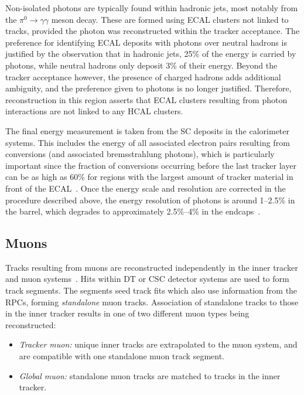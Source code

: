 Non-isolated photons are typically found within hadronic jets, most notably from the $\pi^{0}\rightarrow\gamma\gamma$ meson decay. These are formed using ECAL clusters not linked to tracks, provided the photon was reconstructed within the tracker acceptance. The preference for identifying ECAL deposits with photons over neutral hadrons is justified by the observation that in hadronic jets, 25\% of the energy is carried by photons, while neutral hadrons only deposit 3\% of their energy. Beyond the tracker acceptance however, the presence of charged hadrons adds additional ambiguity, and the preference given to photons is no longer justified. Therefore, reconstruction in this region asserts that ECAL clusters resulting from photon interactions are not linked to any HCAL clusters.

The final energy measurement is taken from the SC deposits in the calorimeter systems. This includes the energy of all associated electron pairs resulting from conversions (and associated bremsstrahlung photons), which is particularly important since the fraction of conversions occurring before the last tracker layer can be as high as 60\% for regions with the largest amount of tracker material in front of the ECAL~\cite{CMS_egamma_performance}. Once the energy scale and resolution are corrected in the procedure described above, the energy resolution of photons is around 1--2.5\% in the barrel, which degrades to approximately 2.5\%--4\% in the endcaps~\cite{photon_conversion_finder,Run2_ECAL_plots}.

\subsection{Muons}

Tracks resulting from muons are reconstructed independently in the inner tracker and muon systems~\cite{muon_reco}. Hits within DT or CSC detector systems are used to form track segments. The segments seed track fits which also use information from the RPCs, forming \textit{standalone} muon tracks. Association of standalone tracks to those in the inner tracker results in one of two different muon types being reconstructed:

\begin{itemize}
    \item \textit{Tracker muon:} unique inner tracks are extrapolated to the muon system, and are compatible with one standalone muon track segment.
    \item \textit{Global muon:} standalone muon tracks are matched to tracks in the inner tracker. 
\end{itemize}

